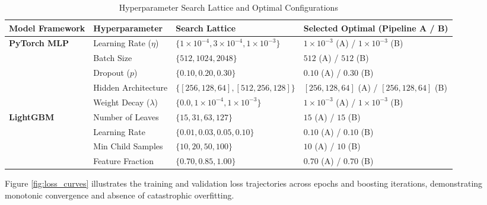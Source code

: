 \documentclass[11pt,a4paper]{article}
\begin{document}
\begin{table}[htbp]
\centering
\caption{Hyperparameter Search Lattice and Optimal Configurations}
\label{tab:hyperparam_space}
\small
\begin{tabular}{llll}
\toprule
\textbf{Model Framework} & \textbf{Hyperparameter} & \textbf{Search Lattice} & \textbf{Selected Optimal (Pipeline A / B)} \\
\midrule
\textbf{PyTorch MLP} & Learning Rate ($\eta$) & $\{1\times 10^{-4}, 3\times 10^{-4}, 1\times 10^{-3}\}$ & $1\times 10^{-3}$ (A) \quad / \quad $1\times 10^{-3}$ (B) \\
& Batch Size & $\{512, 1024, 2048\}$ & $512$ (A) \quad / \quad $512$ (B) \\
& Dropout ($p$) & $\{0.10, 0.20, 0.30\}$ & $0.10$ (A) \quad / \quad $0.30$ (B) \\
& Hidden Architecture & $\{[256, 128, 64], [512, 256, 128]\}$ & $[256, 128, 64]$ (A) \quad / \quad $[256, 128, 64]$ (B) \\
& Weight Decay ($\lambda$) & $\{0.0, 1\times 10^{-4}, 1\times 10^{-3}\}$ & $1\times 10^{-3}$ (A) \quad / \quad $1\times 10^{-3}$ (B) \\
\midrule
\textbf{LightGBM} & Number of Leaves & $\{15, 31, 63, 127\}$ & $15$ (A) \quad / \quad $15$ (B) \\
& Learning Rate & $\{0.01, 0.03, 0.05, 0.10\}$ & $0.10$ (A) \quad / \quad $0.10$ (B) \\
& Min Child Samples & $\{10, 20, 50, 100\}$ & $10$ (A) \quad / \quad $10$ (B) \\
& Feature Fraction & $\{0.70, 0.85, 1.00\}$ & $0.70$ (A) \quad / \quad $0.70$ (B) \\
\bottomrule
\end{tabular}
\end{table}

Figure \ref{fig:loss_curves} illustrates the training and validation loss trajectories across epochs and boosting iterations, demonstrating monotonic convergence and absence of catastrophic overfitting.
\end{document}
